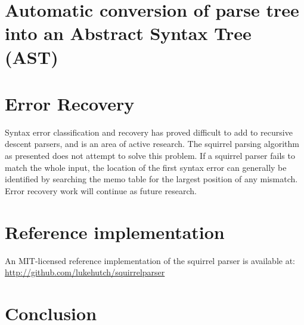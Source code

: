 \documentclass[manuscript]{acmart}
\begin{document}






\section{Automatic conversion of parse tree into an Abstract Syntax Tree (AST)}


\section{Error Recovery}

Syntax error classification and recovery has proved difficult to add to recursive descent parsers, and is an area of active research. %
The squirrel parsing algorithm as presented does not attempt to solve this problem. If a squirrel parser fails to match the whole input, the location of the first syntax error can generally be identified by searching the memo table for the largest position of any mismatch. Error recovery work will continue as future research.

\section{\label{sec:software}Reference implementation}

An MIT-licensed reference implementation of the squirrel parser is available at: \url{http://github.com/lukehutch/squirrelparser}

\section{Conclusion}




\end{document}
